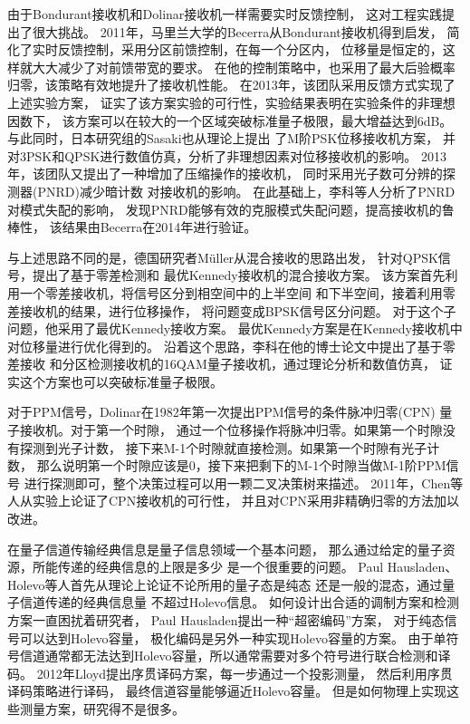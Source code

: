 由于Bondurant接收机和Dolinar接收机一样需要实时反馈控制，
这对工程实践提出了很大挑战。
2011年，马里兰大学的Becerra从Bondurant接收机得到启发，
简化了实时反馈控制，采用分区前馈控制，在每一个分区内，
位移量是恒定的，这样就大大减少了对前馈带宽的要求。
在他的控制策略中，也采用了最大后验概率归零，该策略有效地提升了接收机性能\cite{becerra2011m}。
在2013年，该团队采用反馈方式实现了上述实验方案，
证实了该方案实验的可行性，实验结果表明在实验条件的非理想因数下，
该方案可以在较大的一个区域突破标准量子极限，最大增益达到6dB\cite{becerra2013experimental}。
与此同时，日本研究组的Sasaki也从理论上提出
了M阶PSK位移接收机方案，
并对3PSK和QPSK进行数值仿真，分析了非理想因素对位移接收机的影响\cite{izumi2012displacement}。
2013年，该团队又提出了一种增加了压缩操作的接收机，
同时采用光子数可分辨的探测器(PNRD)减少暗计数
对接收机的影响\cite{izumi2013quantum}。
在此基础上，李科等人分析了PNRD对模式失配的影响，
发现PNRD能够有效的克服模式失配问题，提高接收机的鲁棒性\cite{li2013suppressing}，
该结果由Becerra在2014年进行验证\cite{becerra2015photon}。

与上述思路不同的是，德国研究者Müller从混合接收的思路出发，
针对QPSK信号，提出了基于零差检测和
最优Kennedy接收机的混合接收方案\cite{muller2012quadrature}。
该方案首先利用一个零差接收机，将信号区分到相空间中的上半空间
和下半空间，接着利用零差接收机的结果，进行位移操作，
将问题变成BPSK信号区分问题。
对于这个子问题，他采用了最优Kennedy接收方案。
最优Kennedy方案是在Kennedy接收机中对位移量进行优化得到的。
沿着这个思路，李科在他的博士论文中提出了基于零差接收
和分区检测接收机的16QAM量子接收机，通过理论分析和数值仿真，
证实这个方案也可以突破标准量子极限\cite{李科2014}。

对于PPM信号，Dolinar在1982年第一次提出PPM信号的条件脉冲归零(CPN)
量子接收机\cite{dolinar1982near}。对于第一个时隙，
通过一个位移操作将脉冲归零。如果第一个时隙没有探测到光子计数，
接下来M-1个时隙就直接检测。如果第一个时隙有光子计数，
那么说明第一个时隙应该是0，接下来把剩下的M-1个时隙当做M-1阶PPM信号
进行探测即可，整个决策过程可以用一颗二叉决策树来描述。
2011年，Chen等人从实验上论证了CPN接收机的可行性，
并且对CPN采用非精确归零的方法加以改进\cite{chen2012optical}。

在量子信道传输经典信息是量子信息领域一个基本问题，
那么通过给定的量子资源，所能传递的经典信息的上限是多少
是一个很重要的问题。
Paul Hausladen、Holevo等人首先从理论上论证不论所用的量子态是纯态
还是一般的混态，通过量子信道传递的经典信息量
不超过Holevo信息\cite{hausladen1996classical,holevo1996capacity}。
如何设计出合适的调制方案和检测方案一直困扰着研究者，
Paul Hausladen提出一种“超密编码”方案\cite{hausladen1996classical}，
对于纯态信号可以达到Holevo容量，
极化编码是另外一种实现Holevo容量的方案\cite{wilde2013polar,guha2012polar}。
由于单符号信道通常都无法达到Holevo容量，所以通常需要对多个符号进行联合检测和译码。
2012年Lloyd提出序贯译码方案，每一步通过一个投影测量，
然后利用序贯译码策略进行译码，
最终信道容量能够逼近Holevo容量\cite{giovannetti2012achieving}。
但是如何物理上实现这些测量方案，研究得不是很多。

